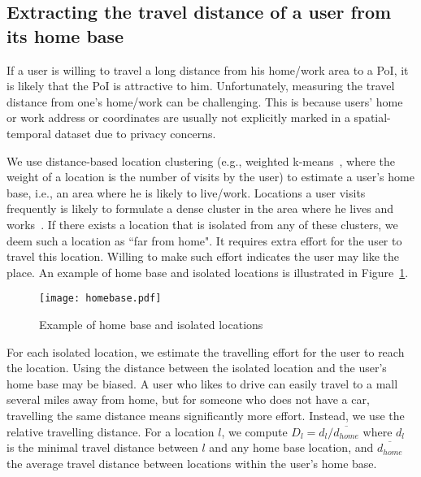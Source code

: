 \subsection{Extracting the travel distance of a user from its home base}

If a user is willing to travel a long distance from his home/work area to a PoI, it is likely that the PoI is attractive to him. Unfortunately, measuring the travel distance from one's home/work can be challenging. This is because users' home or work address or coordinates are usually not explicitly marked in a spatial-temporal dataset due to privacy concerns.

We use distance-based location clustering (e.g., weighted k-means~\cite{kerdprasop2005weighted}, where the weight of a location is the number of visits by the user) to estimate a user's home base, i.e., an area where he is likely to live/work. Locations a user visits frequently is likely to formulate a dense cluster in the area where he lives and works~\cite{golle2009anonymity, zang2011anonymization}. If there exists a location that is isolated from any of these clusters, we deem such a location as ``far from home". It requires extra effort for the user to travel this location. Willing to make such effort indicates the user may like the place. An example of home base and isolated locations is illustrated in Figure~\ref{example}.

\begin{figure}[htb]
\center
{\texttt{[image: homebase.pdf]}}
\caption{Example of home base and isolated locations} 
\label{example}
\end{figure}

For each isolated location, we estimate the travelling effort for the user to reach the location. Using the distance between the isolated location and the user's home base may be biased. A user who likes to drive can easily travel to a mall several miles away from home, but for someone who does not have a car, travelling the same distance means significantly more effort. Instead, we use the relative travelling distance. For a location $l$, we compute $D_l = d_l / \overline{d_{home}}$ where $d_l$ is the minimal travel distance between $l$ and any home base location, and $\overline{d_{home}}$ the average travel distance between locations within the user's home base.

